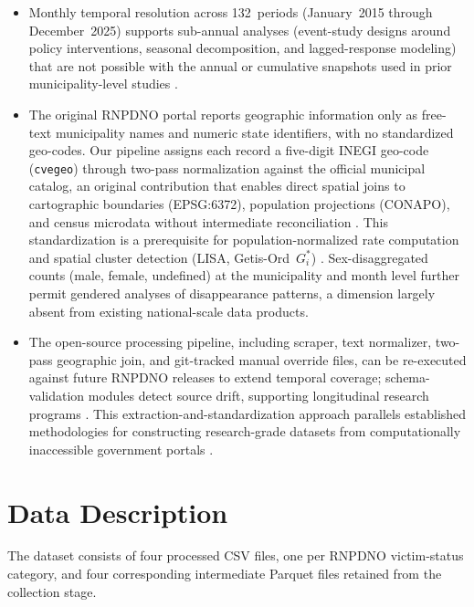 \documentclass[3p]{elsarticle}
\begin{document}
\begin{itemize}
  \item Monthly temporal resolution across 132~periods
    (January~2015 through December~2025) supports sub-annual
    analyses (event-study designs around policy interventions,
    seasonal decomposition, and lagged-response modeling) that
    are not possible with the annual or cumulative snapshots
    used in prior municipality-level studies
    \cite{cadena_garrocho_2019, atuesta_2024}.

  \item The original RNPDNO portal reports geographic information
    only as free-text municipality names and numeric state
    identifiers, with no standardized geo-codes.
    Our pipeline assigns each record a five-digit INEGI geo-code
    (\texttt{cvegeo}) through two-pass normalization against the
    official municipal catalog, an original contribution that
    enables direct spatial joins to cartographic boundaries
    (EPSG:6372), population projections (CONAPO), and census
    microdata without intermediate reconciliation
    \cite{inegi_ageeml}.
    This standardization is a prerequisite for
    population-normalized rate computation and spatial cluster
    detection (LISA, Getis-Ord~$G_i^*$) \cite{anselin_1995}.
    Sex-disaggregated counts (male, female, undefined) at the
    municipality and month level further permit gendered analyses
    of disappearance patterns, a dimension largely absent from
    existing national-scale data products.
    
  \item The open-source processing pipeline, including scraper,
    text normalizer, two-pass geographic join, and git-tracked
    manual override files, can be re-executed against future
    RNPDNO releases to extend temporal coverage;
    schema-validation modules detect source drift, supporting
    longitudinal research programs \cite{reyes_where_2025}.
    This extraction-and-standardization approach parallels
    established methodologies for constructing research-grade
    datasets from computationally inaccessible government
    portals \cite{fazekas_2024}.

\end{itemize}
\FloatBarrier
\clearpage

\section*{Data Description}

The dataset consists of four processed CSV files, one per RNPDNO
victim-status category, and four corresponding intermediate Parquet
files retained from the collection stage.
\end{document}
